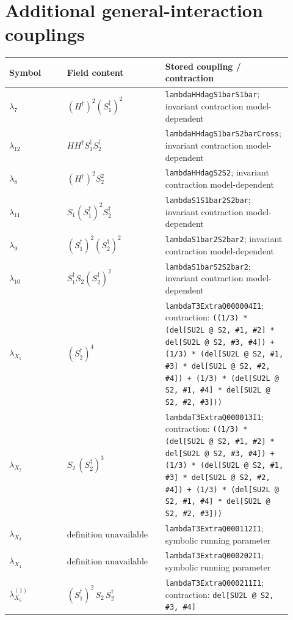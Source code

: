 \documentclass[9pt]{article}
\begin{document}
\section*{Additional general-interaction couplings}
\begin{longtable}{@{}p{0.20\linewidth}p{0.34\linewidth}p{0.38\linewidth}@{}}
\toprule
Symbol & Field content & Stored coupling / contraction \\
\midrule
$\lambda_7$ & $(H^\dagger)^2(S_1^\dagger)^2$ & \texttt{lambdaHHdagS1barS1bar}; invariant contraction model-dependent \\
$\lambda_{12}$ & $HH^\dagger S_1^\dagger S_2^\dagger$ & \texttt{lambdaHHdagS1barS2barCross}; invariant contraction model-dependent \\
$\lambda_8$ & $(H^\dagger)^2S_2^2$ & \texttt{lambdaHHdagS2S2}; invariant contraction model-dependent \\
$\lambda_{11}$ & $S_1(S_1^\dagger)^2S_2^\dagger$ & \texttt{lambdaS1S1bar2S2bar}; invariant contraction model-dependent \\
$\lambda_9$ & $(S_1^\dagger)^2(S_2^\dagger)^2$ & \texttt{lambdaS1bar2S2bar2}; invariant contraction model-dependent \\
$\lambda_{10}$ & $S_1^\dagger S_2(S_2^\dagger)^2$ & \texttt{lambdaS1barS2S2bar2}; invariant contraction model-dependent \\
$\lambda_{X_{1}}$ & $(S_2^\dagger)^{4}$ & \texttt{lambdaT3ExtraQ000004I1}; contraction: \texttt{((1/3) * (del[SU2L @ S2, \#1, \#2] * del[SU2L @ S2, \#3, \#4]) + (1/3) * (del[SU2L @ S2, \#1, \#3] * del[SU2L @ S2, \#2, \#4]) + (1/3) * (del[SU2L @ S2, \#1, \#4] * del[SU2L @ S2, \#2, \#3]))} \\
$\lambda_{X_{2}}$ & $S_2\,(S_2^\dagger)^{3}$ & \texttt{lambdaT3ExtraQ000013I1}; contraction: \texttt{((1/3) * (del[SU2L @ S2, \#1, \#2] * del[SU2L @ S2, \#3, \#4]) + (1/3) * (del[SU2L @ S2, \#1, \#3] * del[SU2L @ S2, \#2, \#4]) + (1/3) * (del[SU2L @ S2, \#1, \#4] * del[SU2L @ S2, \#2, \#3]))} \\
$\lambda_{X_{3}}$ & $\text{definition unavailable in registry}$ & \texttt{lambdaT3ExtraQ000112I1}; symbolic running parameter \\
$\lambda_{X_{4}}$ & $\text{definition unavailable in registry}$ & \texttt{lambdaT3ExtraQ000202I1}; symbolic running parameter \\
$\lambda_{X_{5}}^{(1)}$ & $(S_1^\dagger)^{2}\,S_2\,S_2^\dagger$ & \texttt{lambdaT3ExtraQ000211I1}; contraction: \texttt{del[SU2L @ S2, \#3, \#4]} \\

\end{longtable}
\end{document}
